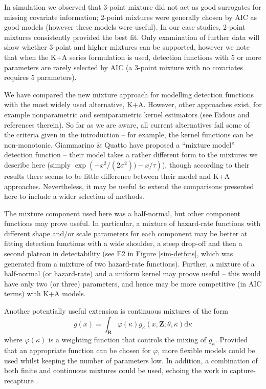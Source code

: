 \documentclass[10pt]{article}
\begin{document}
In simulation we observed that 3-point mixture did not act as good surrogates for missing covariate information; 2-point mixtures were generally chosen by AIC as good models (however these models were useful). In our case studies, 2-point mixtures consistently provided the best fit. Only examination of further data will show whether 3-point and higher mixtures can be supported, however we note that when the K+A series formulation is used, detection functions with 5 or more parameters are rarely selected by AIC (a 3-point mixture with no covariates requires 5 parameters).

We have compared the new mixture approach for modelling detection functions with the most widely used alternative, K+A. However, other approaches exist, for example nonparametric and semiparametric kernel estimators (see Eidous \cite{Eidous:2011} and references therein).  So far as we are aware, all current alternatives fail some of the criteria given in the introduction -- for example, the kernel functions can be non-monotonic. Giammarino \& Quatto \cite{Giammarino:2014eg} have proposed a ``mixture model'' detection function -- their model takes a rather different form to the mixtures we describe here (simply $\exp\left( -x^2/(2\sigma^2)) - x/\tau\right)$), though according to their results there seems to be little difference between their model and K+A approaches. Nevertheless, it may be useful to extend the comparisons presented here to include a wider selection of methods.

The mixture component used here was a half-normal, but other component functions may prove useful.  In particular, a mixture of hazard-rate functions with different shape and/or scale parameters for each component may be better at fitting detection functions with a wide shoulder, a steep drop-off and then a second plateau in detectability (see E2 in Figure \ref{sim-detfcts}, which was generated from a mixture of two hazard-rate functions).  Further, a mixture of a half-normal (or hazard-rate) and a uniform kernel may proove useful -- this would have only two (or three) parameters, and hence may be more competitive (in AIC terms) with K+A models.

Another potentially useful extension is continuous mixtures of the form
\begin{equation*}
g(x) = \int_\mathbf{R} \varphi(\kappa) g_\kappa(x,\mathbf{Z}; \theta, \kappa) \text{d}\kappa
\end{equation*}
where $\varphi(\kappa)$ is a weighting function that controls the mixing of $g_\kappa$. Provided that an appropriate function can be chosen for $\varphi$, more flexible models could be used whilst keeping the number of parameters low. In addition, a combination of both finite and continuous mixtures could be used, echoing the work in capture-recapture \cite{Morgan:2008wy}.
\end{document}
